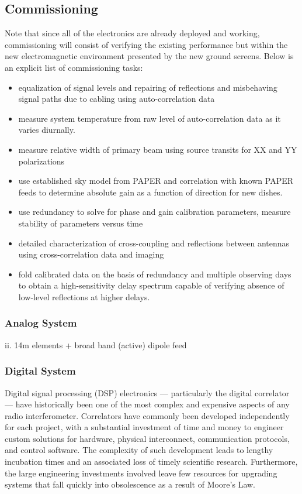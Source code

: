 \documentclass[preprint]{aastex}
\begin{document}
\vspace{-0.25in}
\subsection{Commissioning}
\vspace{-6pt}
Note that since all of the electronics are already deployed and working, commissioning will consist of verifying the existing performance but within the new electromagnetic environment presented by the new ground screens.  Below is
an explicit list of commissioning tasks:
\begin{itemize}[noitemsep,nolistsep]
\item equalization of signal levels and repairing of reflections and misbehaving signal paths due to cabling using auto-correlation data 
\item measure system temperature from raw level of auto-correlation data as it varies diurnally.
\item measure relative width of primary beam using source transits for XX and YY polarizations 
\item use established sky model from PAPER and correlation with known PAPER feeds to 
determine absolute gain as a function of direction for new dishes. 
\item use redundancy to solve for phase and gain calibration parameters, measure stability of parameters versus 
time 
\item detailed characterization of cross-coupling and reflections between antennas using cross-correlation data and imaging 
\item fold calibrated data on the basis of redundancy and multiple observing days to obtain a high-sensitivity delay spectrum capable of verifying absence of low-level reflections at higher delays. 
\end{itemize}


\subsubsection{Analog System}
ii. 14m elements + broad band (active) dipole feed

\subsubsection{Digital System}

Digital signal processing (DSP) electronics --- particularly the digital correlator ---
have historically been one of the most complex and expensive aspects of any radio interferometer.
Correlators have commonly been
developed independently for each project, with a substantial investment
of time and money to engineer
custom solutions for hardware, physical interconnect,
communication protocols, and control software. The complexity of such development
leads to lengthy incubation times and an
associated loss of timely scientific research. Furthermore, the large
engineering investments involved leave few resources
for upgrading systems that fall quickly into obsolescence as a result
of Moore's Law.
\end{document}
